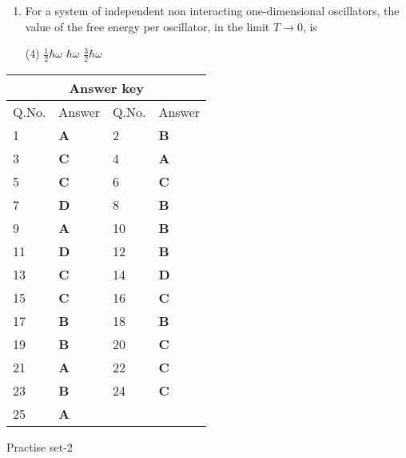 \begin{enumerate}
	\item For a system of independent non interacting one-dimensional oscillators, the value of the free energy per oscillator, in the limit $T \rightarrow 0$, is
	{}
\begin{tasks}(4)
	\task[\textbf{A.}] $\frac{1}{2} \hbar \omega$
	\task[\textbf{B.}] $\hbar \omega$
	\task[\textbf{C.}] $\frac{3}{2} \hbar \omega$
\end{tasks}

\end{enumerate}
\setlength\arrayrulewidth{1pt}
\begin{table}[H]
	\centering
	\begin{tabular}{|p{1.5cm}|p{1.5cm}||p{1.5cm}|p{1.5cm}|}
		\hline
		\multicolumn{4}{|c|}{\textbf{Answer key}}\\\hline\hline
		\rowcolor{ocrel}Q.No.&Answer&Q.No.&Answer\\\hline
		1&\textbf{A} &2&\textbf{B}\\\hline
		3&\textbf{C} &4&\textbf{A} \\\hline
		5&\textbf{C} &6&\textbf{C} \\\hline
		7&\textbf{D}&8&\textbf{B}\\\hline
		9&\textbf{A}&10&\textbf{B}\\\hline
		11&\textbf{D} &12&\textbf{B}\\\hline
		13&\textbf{C}&14&\textbf{D}\\\hline
		15&\textbf{C}&16 &\textbf{C}\\\hline
		17&\textbf{B}&18 &\textbf{B}\\\hline
		19&\textbf{B}&20 &\textbf{C}\\\hline
		21&\textbf{A}&22 &\textbf{C}\\\hline
		23&\textbf{B}&24 &\textbf{C}\\\hline
		25 &\textbf{A}& &\\\hline
	\end{tabular}
\end{table}
\begin{abox}
	Practise set-2
\end{abox}
